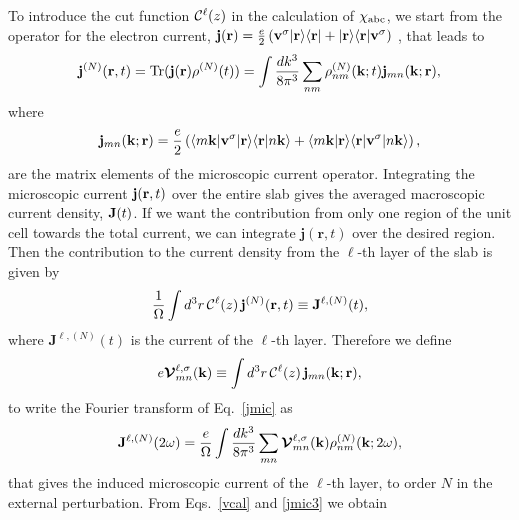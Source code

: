 \documentclass[floatfix,prb,aps,superscriptaddress,11pt,preprint,letterpaper]{revtex4}
\def\chon{red}
\begin{document}
To introduce the
cut function ${\mathbf{\cal C}}^\ell(z)$ in
the calculation of $\chi_{\mathrm{a}\mathrm{b}\mathrm{c}}$, we start from 
the operator for the electron current,
$\mathbf{j}(\mathbf{r})=\frac{e}{2}\left(\mathbf{v}^\sigma| \mathbf{r} \rangle\langle \mathbf{r} |
+| \mathbf{r} \rangle\langle \mathbf{r} |\mathbf{v}^\sigma\right)${\color{\chon} , that} leads to
\begin{align}\label{jmic}
\mathbf{j}^{(N)}(\mathbf{r},t)=\mathrm{Tr}(\mathbf{j}(\mathbf{r})\rho^{(N)}(t))
=
\int \frac{dk^3}{8\pi^3}
\sum_{nm}
\rho^{(N)}_{nm}(\mathbf{k};t)\mathbf{j}_{mn}(\mathbf{k};\mathbf{r})
,
\end{align}
where 
\begin{equation}\label{jmic3}
\mathbf{j}_{mn}(\mathbf{k};\mathbf{r})=
\frac{e}{2}
\left(
\langle m\mathbf{k} |\mathbf{v}^\sigma| \mathbf{r} \rangle\langle {\mathbf{r}} | {n\mathbf{k}} \rangle
+
\langle {m\mathbf{k}} | {\mathbf{r}} \rangle\langle \mathbf{r} |\mathbf{v}^\sigma| n\mathbf{k} \rangle
\right),
\end{equation}
are the matrix elements of the microscopic current operator.
Integrating the microscopic current $\mathbf{j}(\mathbf{r},t)$ over
the entire slab gives the averaged macroscopic current density, $\mathbf{J}(t)$. 
If we want the contribution from only one region of the unit cell 
{\color{\chon} towards} the total current, we can integrate $\mathbf{j}({\mathbf r},t)$ 
over the desired region. {\color{\chon} Then the} contribution 
to the current density from the
$\ell$-th layer of the slab is given by
\begin{equation}\label{jsz}
\frac{1}{\Omega}\int d^3r\, {\mathbf{\cal C}}^\ell(z)\, \mathbf{j}^{(N)}(\mathbf{r},t)
 \equiv \mathbf{J}^{\ell,(N)}(t),
\end{equation}
where $\mathbf{J}^{\ell,(N)}(t)$ is the current of the
$\ell$-th layer.
Therefore we define
\begin{equation}\label{vcal}
e{\boldsymbol{\mathcal{V}}}^{\ell,\sigma}_{mn}(\mathbf{k})
\equiv
\int d^3r\, {\mathbf{\cal C}}^\ell(z)\,\mathbf{j}_{mn}({\mathbf{k}};\mathbf{r}),
\end{equation}
to write the Fourier transform of Eq.~\eqref{jmic} as
\begin{equation}\label{jmac2}
\mathbf{J}^{\ell,(N)}(2\omega)=\frac{e}{\Omega}
\int \frac{dk^3}{8\pi^3}
\sum_{mn}
\boldsymbol{\mathcal{\cal V}}^{\ell,\sigma}_{mn}(\mathbf{k}) 
\rho^{(N)}_{nm}(\mathbf{k};2\omega) 
, 
\end{equation}
that gives the induced microscopic current of the $\ell$-th layer, to order $N$ 
in the external perturbation. 
From
Eqs.~\eqref{vcal} and \eqref{jmic3} we obtain
\end{document}
